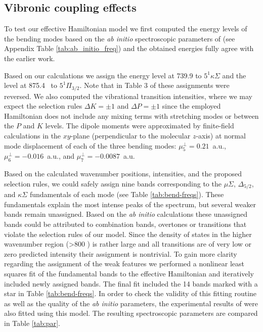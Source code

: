 \subsection{Vibronic coupling effects}
\label{sec:bend}
To test our effective Hamiltonian model we first computed the energy levels of the bending modes based on the \emph{ab initio} spectroscopic parameters of \citet{Dai2015TheCalculations} (see Appendix Table \ref{tab:ab_initio_freq}) and the obtained energies fully agree with the earlier work.
 
Based on our calculations we assign the energy level at 739.9 \wns to $5^1 \kappa \Sigma$ and the level at 875.4 \wn\ to $5^1 \Pi_{3/2}$.
Note that in Table 3 of \citet{Dai2015TheCalculations} these assignments were reversed.
We also computed the vibrational transition intensities, where we may expect the selection rules $\Delta K = \pm 1 $ and $\Delta P = \pm 1 $ since the employed Hamiltonian does not include any mixing terms with stretching modes or between the $P$ and $K$ levels. The dipole moments were approximated by finite-field calculations in the $xy$-plane (perpendicular to the molecular $z$-axis) at normal mode displacement of each of the three bending modes: $\mu^{\perp}_5=0.21$~a.u., $\mu^{\perp}_6=-0.016$~a.u., and $\mu^{\perp}_7=-0.0087$~a.u.   


Based on the calculated wavenumber positions, intensities, and the proposed selection rules, we could safely assign nine bands corresponding to the $\mu\Sigma$, $\Delta_{5/2}$, and $\kappa\Sigma$ fundamentals of each mode (see Table \ref{tab:bend-freqs}). 
These fundamentals explain the most intense peaks of the spectrum, but several weaker bands remain unassigned. 
Based on the \emph{ab initio} calculations these unassigned bands could be attributed to combination bands, overtones or transitions that violate the selection rules of our model. 
Since the density of states in the higher wavenumber region (>800 \wn) is rather large and all transitions are of very low or zero predicted intensity their assignment is nontrivial. 
To gain more clarity regarding the assignment of the weak features we performed a nonlinear least squares fit of the fundamental bands to the effective Hamiltonian and iteratively included newly assigned bands. The final fit included the 14 bands marked with a star in Table \ref{tab:bend-freqs}.
In order to check the validity of this fitting routine as well as the quality of the \emph{ab initio} parameters, the experimental results of \citet{Dai2015TheCalculations} were also fitted using this model. The resulting spectroscopic parameters are compared in Table \ref{tab:par}.


